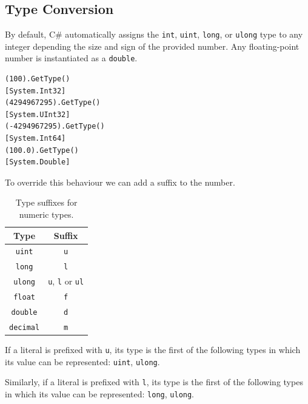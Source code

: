 \documentclass{article}
\def\customlinemarker#1#2{
    \edef\thelstnumber{%
        \unexpanded{%
            \ifnum#1=\value{lstnumber}\relax
              #2%
            \fi}%
        \ifx\thelstnumber\relax\else
        \expandafter\unexpanded\expandafter{\thelstnumber}%
        \fi
    }
}
\begin{document}
\subsection{Type Conversion}
By default, C\# automatically assigns the \lstinline{int}, \lstinline{uint},
\lstinline{long}, or \lstinline{ulong} type to any integer \linebreak depending the size and sign
of the provided number. Any floating-point number is instantiated as a \lstinline{double}.
\begingroup
\let\thelstnumber\relax
\customlinemarker{1}{\$}
\customlinemarker{3}{\$}
\customlinemarker{5}{\$}
\customlinemarker{7}{\$}
\begin{lstlisting}
(100).GetType()
[System.Int32]
(4294967295).GetType()    
[System.UInt32]
(-4294967295).GetType()
[System.Int64]
(100.0).GetType()
[System.Double]
\end{lstlisting}
\endgroup
To override this behaviour we can add a suffix to the number.
\begin{table}[H]
    \centering
    \begin{tabular}{c c}
        \toprule
        \textbf{Type}       & \textbf{Suffix}                                \\
        \midrule
        \lstinline!uint!    & \lstinline!u!                                  \\
        \lstinline!long!    & \lstinline!l!                                  \\
        \lstinline!ulong!   & \lstinline!u!, \lstinline!l! or \lstinline!ul! \\
        \midrule
        \lstinline!float!   & \lstinline!f!                                  \\
        \lstinline!double!  & \lstinline!d!                                  \\
        \lstinline!decimal! & \lstinline!m!                                  \\
        \bottomrule
    \end{tabular}
    \caption{Type suffixes for numeric types.}
\end{table}
If a literal is prefixed with \lstinline{u}, its type is the first
of the following types in which its value can be represented:
\lstinline{uint}, \lstinline{ulong}.

Similarly, if a literal is prefixed with \lstinline{l}, its type is the first
of the following types in which its value can be represented:
\lstinline{long}, \lstinline{ulong}.
\end{document}
